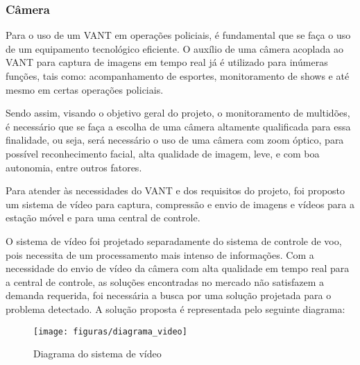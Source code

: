 \subsubsection{Câmera}

Para o uso de um VANT em operações policiais, é fundamental que se faça o uso de um equipamento tecnológico eficiente. O auxílio de uma câmera acoplada ao VANT para captura de imagens em tempo real já é utilizado para inúmeras funções, tais como: acompanhamento de esportes, monitoramento de shows e até mesmo em certas operações policiais.

Sendo assim, visando o objetivo geral do projeto, o monitoramento de multidões, é necessário que se faça a escolha de uma câmera altamente qualificada para essa finalidade, ou seja, será necessário o uso de uma câmera com zoom óptico, para possível reconhecimento facial, alta qualidade de imagem, leve, e com boa autonomia, entre outros fatores.

Para atender às necessidades do VANT e dos requisitos do projeto, foi proposto um sistema de vídeo para captura, compressão e envio de imagens e vídeos para a estação móvel e para uma central de controle.

O sistema de vídeo foi projetado separadamente do sistema de controle de voo, pois necessita de um processamento mais intenso de informações. Com a necessidade do envio de vídeo da câmera com alta qualidade em tempo real para a central de controle, as soluções encontradas no mercado não satisfazem a demanda requerida, foi necessária a busca por uma solução projetada para o problema detectado. A solução proposta é representada pelo seguinte diagrama:

\begin{figure}
\centering\texttt{[image: figuras/diagrama\_video]}
\caption{Diagrama do sistema de vídeo}
\end{figure}

